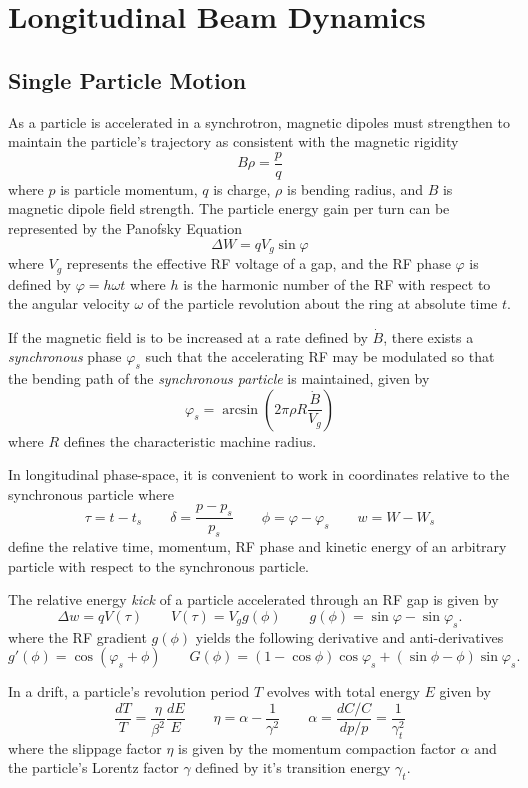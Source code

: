 \section{Longitudinal Beam Dynamics}

\subsection{Single Particle Motion}

As a particle is accelerated in a synchrotron, magnetic dipoles must strengthen to maintain the particle's trajectory as consistent with the magnetic rigidity $$B\rho=\frac{p}{q}$$ where $p$ is particle momentum, $q$ is charge, $\rho$ is bending radius, and $B$ is magnetic dipole field strength. The particle energy gain per turn can be represented by the Panofsky Equation \cite{panofsky_considerations_1956} $$\Delta W = q V_g\sin\varphi$$ where $V_g$ represents the effective RF voltage of a gap, and the RF phase $\varphi$ is defined by $\varphi=h\omega t$ where $h$ is the harmonic number of the RF with respect to the angular velocity $\omega$ of the particle revolution about the ring at absolute time $t$.

If the magnetic field is to be increased at a rate defined by $\dot{B}$, there exists a \textit{synchronous} phase $\varphi_s$ such that the accelerating RF may be modulated so that the bending path of the \textit{synchronous particle} is maintained, given by $$\varphi_s=\arcsin\left(2\pi\rho R\frac{\dot{B}}{V_g}\right)$$ where $R$ defines the characteristic machine radius.

In longitudinal phase-space, it is convenient to work in coordinates relative to the synchronous particle where $$\tau = t - t_s \qquad \delta = \frac{p-p_s}{p_s} \qquad \phi = \varphi - \varphi_s \qquad w = W-W_s$$ define the relative time, momentum, RF phase and kinetic energy of an arbitrary particle with respect to the synchronous particle.

The relative energy \textit{kick} of a particle accelerated through an RF gap is given by
\begin{equation}
    \Delta w = q V(\tau) \qquad
    V(\tau) = V_g g(\phi) \qquad
    g(\phi) = \sin\varphi-\sin\varphi_s.
    \label{eq:kick}
\end{equation}
where the RF gradient $g(\phi)$ yields the following derivative and anti-derivatives $$g'(\phi)=\cos(\varphi_s+\phi) \qquad G(\phi)=(1-\cos\phi)\cos\varphi_s+(\sin\phi-\phi)\sin\varphi_s.$$

In a drift, a particle's revolution period $T$ evolves with total energy $E$ given by \begin{equation}
    \frac{dT}{T} = \frac{\eta}{\beta^2}\frac{dE}{E} \qquad \eta =\alpha- \frac{1}{\gamma^2} \qquad \alpha = \frac{dC/C}{dp/p} = \frac{1}{\gamma_t^2}
    \label{eq:drift}
\end{equation}
where the slippage factor $\eta$ is given by the momentum compaction factor $\alpha$ and the particle's Lorentz factor $\gamma$ defined by it's transition energy $\gamma_t$.

